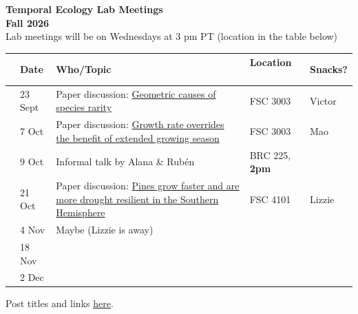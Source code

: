 \documentclass[11pt]{article}
\begin{document}
 
\raggedright
{}

\begin{center} 
{\large \textbf{Temporal Ecology Lab Meetings \\ Fall 2026}} \\ [2pt]
Lab meetings will be on Wednesdays at 3 pm PT (location in the table below)\\ %
\end{center} 

\begin{center}
\begin{tabular}{ p{0.2 cm}  p{3.2 cm}  p{7 cm}  p{3 cm} p{1.5 cm} }  \hline
 & \textbf{Date}
   & \textbf{Who/Topic}
      & \textbf{Location}  \
            & \textbf{Snacks?}  \\ 
\hline 
& 23 Sept &  Paper discussion:\newline\vspace{-3pt} \href{https://www.biorxiv.org/content/10.64898/2026.09.02.748835v1}{Geometric causes of species rarity} & FSC 3003 & Victor \\\hline
& 7 Oct &  Paper discussion:\newline\vspace{-3pt} \href{https://www.science.org/doi/10.1126/science.aec8866}{Growth rate overrides the benefit of extended growing season} & FSC 3003 & Mao \\\hline
& 9 Oct &  Informal talk by Alana \& Rubén & BRC 225, \textbf{2pm} &  \\\hline
& 21 Oct &  Paper discussion:\newline\vspace{-3pt} \href{https://doi.org/10.1038/s41586-026-10969-8}{Pines grow faster and are more drought resilient in the Southern Hemisphere} & FSC 4101 & Lizzie \\\hline
& 4 Nov &  Maybe (Lizzie is away) &  &  \\\hline
& 18 Nov &  &  &  \\\hline
& 2 Dec &   &  &  \\\hline
\end{tabular}
\end{center}

  Post titles and links \href{https://docs.google.com/document/d/1j0WdDbjdp8ERLSO7whvtnP-tOblYMlX33TSCXy_uRKo/edit?usp=sharing}{\underline{here}}. 
\end{document}
